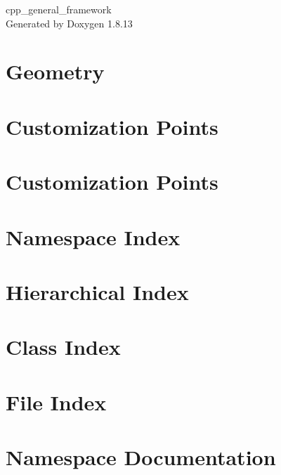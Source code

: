 \documentclass[twoside]{book}
\newcommand{\+}{\discretionary{\mbox{\scriptsize$\hookleftarrow$}}{}{}}
\newcommand{\clearemptydoublepage}{%
  \newpage{\pagestyle{empty}\cleardoublepage}%
}
\begin{document}
\hypersetup{pageanchor=false,
             bookmarksnumbered=true,
             pdfencoding=unicode
            }
\begin{titlepage}
\vspace*{7cm}
\begin{center}%
{\Large cpp\+\_\+general\+\_\+framework }\\
\vspace*{1cm}
{\large Generated by Doxygen 1.8.13}\\
\end{center}
\end{titlepage}
\clearemptydoublepage
{}
\tableofcontents
\clearemptydoublepage
{}
\hypersetup{pageanchor=true}

\chapter{Geometry}
\label{autotoc_md0}

\chapter{Customization Points}
\label{autotoc_md1}

\chapter{Customization Points}
\label{autotoc_md4}

\chapter{Namespace Index}

\chapter{Hierarchical Index}

\chapter{Class Index}

\chapter{File Index}

\chapter{Namespace Documentation}











\end{document}
